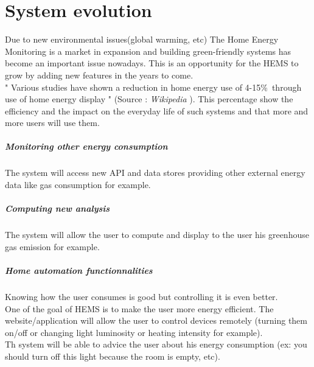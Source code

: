 \chapter{System evolution}
\label{ch:evolution}
Due to new environmental issues(global warming, etc) The Home Energy Monitoring is a market in expansion and building green-friendly systems has become an important issue nowadays. This is an opportunity for the HEMS to grow by adding new features in the years to come. \\
" Various studies have shown a reduction in home energy use of 4-15\%\ through use of home energy display " (Source : \textit{Wikipedia} ). This percentage show the efficiency and the impact on the everyday life of such systems and that more and more users will use them. 

 \paragraph{Monitoring other energy consumption}
 The system will access new API and data stores providing other external energy data like gas consumption for example. 

 \paragraph{Computing new analysis}
The system will allow the user to compute and display to the user his greenhouse gas emission for example.

  
 \paragraph{Home automation functionnalities}
Knowing how the user consumes is good but controlling it is even better. \\ One of the goal of HEMS is to make the user more energy efficient.
The website/application will allow the user to control devices remotely (turning them on/off or changing light luminosity or heating intensity for example). \\
Th system will be able to advice the user about his energy consumption (ex: you should turn off this light because the room is empty, etc).